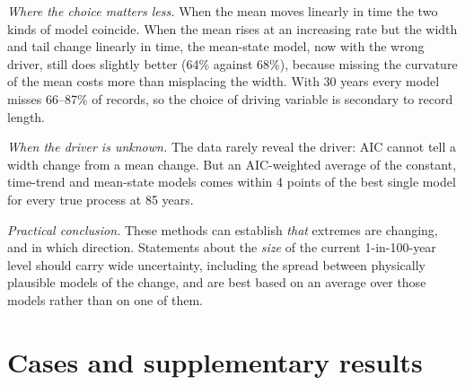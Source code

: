 \documentclass[11pt]{article}
\begin{document}
\emph{Where the choice matters less.} When the mean moves linearly in time the two kinds of model
coincide. When the mean rises at an increasing rate but the width and tail change linearly in time,
the mean-state model, now with the wrong driver, still does slightly better (64\% against 68\%),
because missing the curvature of the mean costs more than misplacing the width. With 30 years every
model misses 66--87\% of records, so the choice of driving variable is secondary to record length.

\emph{When the driver is unknown.} The data rarely reveal the driver: AIC cannot tell a width change
from a mean change. But an AIC-weighted average of the constant, time-trend and mean-state models
comes within 4 points of the best single model for every true process at 85 years.

\emph{Practical conclusion.} These methods can establish \emph{that} extremes are changing, and in
which direction. Statements about the \emph{size} of the current 1-in-100-year level should carry
wide uncertainty, including the spread between physically plausible models of the change, and are
best based on an average over those models rather than on one of them.

\appendix
\section{Cases and supplementary results}

\begin{table}[H]
\centering
\small

\caption{Cases of the quantification study. Standard: one feature of the daily distribution changes linearly or in a step. Covariate model: the width and tail follow an accelerating mean state (for the gamma, every quantile scales with the mean). Time-driven: the same first- and last-year distributions as the covariate-model cases, reached linearly in time. Changes: mean in baseline daily sd; width as a factor; tail as the change in log(shape), the log of the gamma shape $a$, the $t$ degrees of freedom $\nu$ or the beta $\beta$ (increasing it lightens the tail of the gamma and $t$); position as the change in $\log\alpha$ of the beta. $\Delta X_{0.99}$: resulting true change in the 1-in-100-year level over an 85-year record (baseline daily sd).}
\label{tab:cases}
\end{table}

\begin{table}[H]
\centering
\small

\caption{The misses of Table~\ref{tab:wrong} at 85 years split by direction: share of records (\%) with the risk understated at least twofold (top: true probability of exceeding the estimated level above 2\%, so the level is too low) and overstated at least twofold (bottom: below 0.5\%, too high), by true process (rows) and fitted model (columns as in Table~\ref{tab:wrong}). Bold: the model's form contains the true process.}
\label{tab:wrongdetail}
\end{table}
\end{document}

